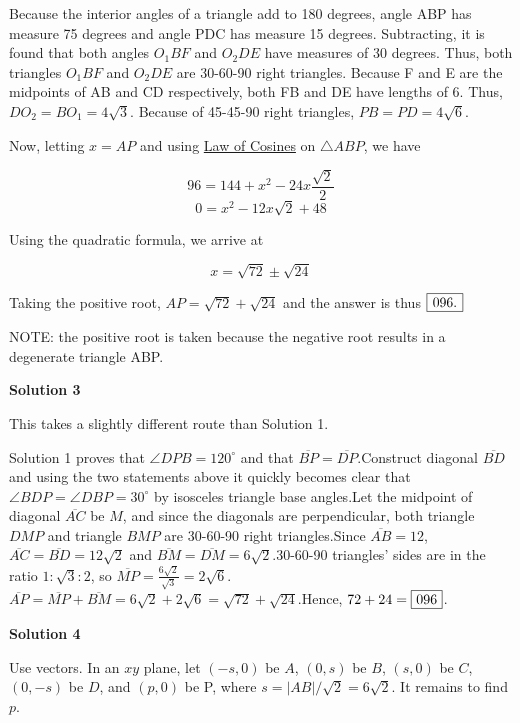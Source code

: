 \begin{enumerate}
 Because the interior angles of a triangle add to 180 degrees, angle ABP has measure 75 degrees and angle PDC has measure 15 degrees. Subtracting, it is found that both angles $O_{1}BF$ and $O_{2}DE$ have measures of 30 degrees. Thus, both triangles $O_{1}BF$ and $O_{2}DE$ are 30-60-90 right triangles. Because F and E are the midpoints of AB and CD respectively, both FB and DE have lengths of 6. Thus, $DO_{2}=BO_{1}=4\sqrt{3}$. Because of 45-45-90 right triangles, $PB=PD=4\sqrt{6}$.

 Now, letting $x = AP$ and using \href{https://artofproblemsolving.com/wiki/index.php?title=Law\_of\_Cosines}{Law of Cosines} on $\triangle ABP$, we have

 
 \[96=144+x^{2}-24x\frac{\sqrt{2}}{2}\]
 \[0=x^{2}-12x\sqrt{2}+48\]

 Using the quadratic formula, we arrive at

 
 \[x = \sqrt{72} \pm \sqrt{24}\]

 Taking the positive root, $AP=\sqrt{72}+ \sqrt{24}$ and the answer is thus $\framebox[1.5\width]{096.}$

 NOTE: the positive root is taken because the negative root results in a degenerate triangle ABP.

 



\textbf{Solution 3}

This takes a slightly different route than Solution 1.

 Solution 1 proves that $\angle{DPB}=120^{\circ}$ and that $\overline{BP} = \overline{DP}$.Construct diagonal $\overline{BD}$ and using the two statements above it quickly becomes clear that $\angle{BDP} = \angle{DBP} = 30^{\circ}$ by isosceles triangle base angles.Let the midpoint of diagonal $\overline{AC}$ be $M$, and since the diagonals are perpendicular, both triangle $DMP$ and triangle $BMP$ are 30-60-90 right triangles.Since $\overline{AB} = 12$, $\overline{AC} = \overline{BD} = 12\sqrt{2}$ and $\overline{BM} = \overline{DM} = 6\sqrt{2}$.30-60-90 triangles' sides are in the ratio $1 : \sqrt{3} : 2$, so $\overline{MP} = \frac{6\sqrt{2}}{\sqrt{3}} = 2\sqrt {6}$.$\overline{AP} = \overline{MP} + \overline{BM} = 6\sqrt{2} + 2\sqrt{6} = \sqrt{72} + \sqrt{24}$.Hence, $72 + 24 = \framebox[1.5\width]{096}$.

 



\textbf{Solution 4}

Use vectors. In an $xy$ plane, let $(-s,0)$ be $A$, $(0,s)$ be $B$, $(s,0)$ be $C$, $(0,-s)$ be $D$, and $(p,0)$ be P, where $s=|AB|/\sqrt{2}=6\sqrt{2}$. It remains to find $p$.


\end{enumerate}
